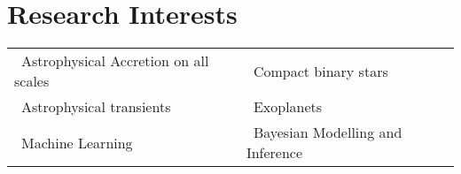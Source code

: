 \documentclass{article}
\newcommand{\tb}{\textbullet}
\newcommand{\saao}{\gls*{saao}\xspace}
\begin{document}
% 
%  
%  
%  
  


\section{Research Interests} 

\begin{tabular}{l l}
  \tb \ Astrophysical Accretion on all scales & \tb \ Compact binary stars \\
  \tb \ Astrophysical transients              & \tb \ Exoplanets \\
  \tb \ Machine Learning                      & \tb \ Bayesian Modelling and Inference \\
\end{tabular}
\end{document}
